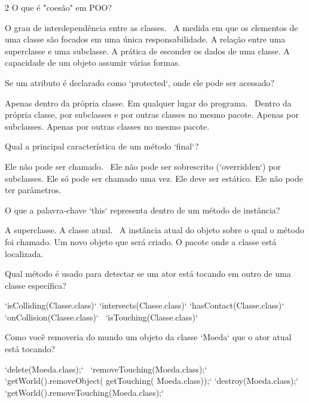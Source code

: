 \documentclass{exam}
\newcounter{solcount}
\newcommand\CC{\
    \CorrectChoice\label{sol:\arabic{solcount}}}
\begin{document}
\begin{questions}
\begin{multicols}{2}
\question[1] O que é "coesão" em POO?
\begin{choices}
 \choice O grau de interdependência entre as classes.
 \CC A medida em que os elementos de uma classe são focados em uma única responsabilidade.
 \choice A relação entre uma superclasse e uma subclasse.
 \choice A prática de esconder os dados de uma classe.
 \choice A capacidade de um objeto assumir várias formas.
\end{choices}

\question[1] Se um atributo é declarado como `protected`, onde ele pode ser acessado?
\begin{choices}
 \choice Apenas dentro da própria classe.
 \choice Em qualquer lugar do programa.
 \CC Dentro da própria classe, por subclasses e por outras classes no mesmo pacote.
 \choice Apenas por subclasses.
 \choice Apenas por outras classes no mesmo pacote.
\end{choices}

\question[1] Qual a principal característica de um método `final`?
\begin{choices}
 \choice Ele não pode ser chamado.
 \CC Ele não pode ser sobrescrito (`overridden`) por subclasses.
 \choice Ele só pode ser chamado uma vez.
 \choice Ele deve ser estático.
 \choice Ele não pode ter parâmetros.
\end{choices}

\question[1] O que a palavra-chave `this` representa dentro de um método de instância?
\begin{choices}
 \choice A superclasse.
 \choice A classe atual.
 \CC A instância atual do objeto sobre o qual o método foi chamado.
 \choice Um novo objeto que será criado.
 \choice O pacote onde a classe está localizada.
\end{choices}


\question[1] Qual método é usado para detectar se um ator está tocando em outro de uma classe específica?
\begin{choices}
 \choice `isColliding(Classe.class)`
 \choice `intersects(Classe.class)`
 \choice `hasContact(Classe.class)`
 \choice `onCollision(Classe.class)`
 \CC `isTouching(Classe.class)`
\end{choices}

\question[1] Como você removeria do mundo um objeto da classe `Moeda` que o ator atual está tocando?
\begin{choices}
 \choice `delete(Moeda.class);`
 \CC `removeTouching(Moeda.class);`
 \choice `getWorld().removeObject( getTouching( Moeda.class));`
 \choice `destroy(Moeda.class);`
 \choice `getWorld().removeTouching(Moeda.class);`
\end{choices}


\end{multicols}
\end{questions}
\end{document}
